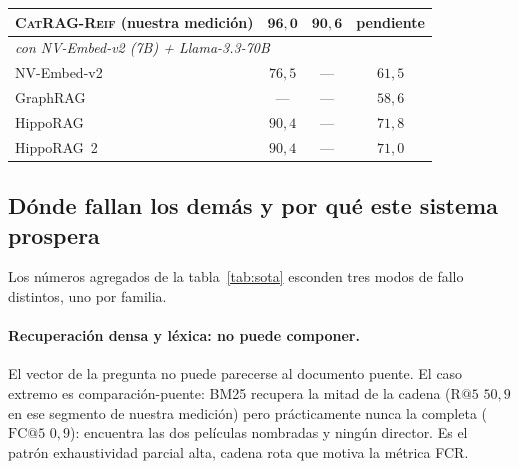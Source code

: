 \documentclass[11pt,a4paper]{article}
\newcommand{\sys}{\textsc{CatRAG-Reif}}          %
\newcommand{\hippo}{HippoRAG~2}
\begin{document}
\begin{table}[t]
\begin{tabular}{lccc}
\textbf{\sys{} (nuestra medición)} & $\mathbf{96{,}0}$ & $\mathbf{90{,}6}$ & pendiente\\
\midrule
\multicolumn{4}{l}{\emph{con NV-Embed-v2 (7B) + Llama-3.3-70B~\cite{hipporag2}}}\\
NV-Embed-v2~\cite{nvembed} & $76{,}5$ & --- & $61{,}5$\\
GraphRAG~\cite{graphrag} & --- & --- & $58{,}6$\\
HippoRAG~\cite{hipporag} & $90{,}4$ & --- & $71{,}8$\\
\hippo{}~\cite{hipporag2} & $90{,}4$ & --- & $71{,}0$\\
\bottomrule
\end{tabular}
\end{table}

\subsection{Dónde fallan los demás y por qué este sistema prospera}
\label{sec:fallan-otros}

Los números agregados de la tabla~\ref{tab:sota} esconden tres modos de
fallo distintos, uno por familia.

\paragraph{Recuperación densa y léxica: no puede componer.}
El vector de la pregunta no puede parecerse al documento puente. El caso
extremo es comparación-puente: BM25 recupera la mitad de la cadena
($\mathrm{R@}5$ $50{,}9$ en ese segmento de nuestra medición) pero
prácticamente nunca la completa ($\mathrm{FC@}5$ $0{,}9$): encuentra las
dos películas nombradas y ningún director. Es el patrón
\guillemotleft{}exhaustividad parcial alta, cadena rota\guillemotright{} que motiva la métrica FCR.
\end{document}
